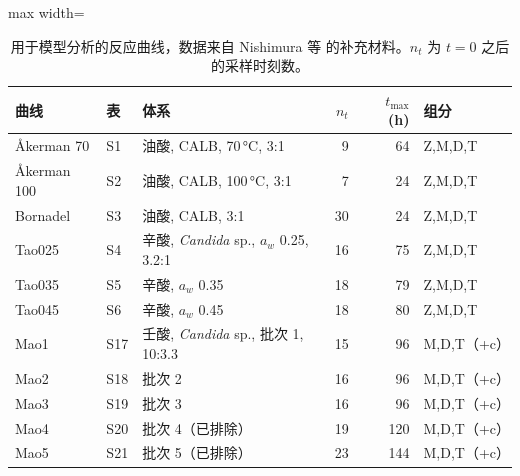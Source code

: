 \begin{table}[t]
\centering
\caption{用于模型分析的反应曲线，数据来自 Nishimura 等 \cite{nishimura2026} 的补充材料。$n_t$ 为 $t=0$ 之后的采样时刻数。}\label{tab:data}
\footnotesize
\begin{adjustbox}{max width=\linewidth}
\begin{tabular}{lllrrl}
\toprule
曲线 & 表 & 体系 & $n_t$ & $t_\mathrm{max}$ (h) & 组分 \\
\midrule
Åkerman 70 & S1 & 油酸, CALB, 70\,°C, 3:1 & 9 & 64 & Z,M,D,T \\
Åkerman 100 & S2 & 油酸, CALB, 100\,°C, 3:1 & 7 & 24 & Z,M,D,T \\
Bornadel & S3 & 油酸, CALB, 3:1 & 30 & 24 & Z,M,D,T \\
Tao025 & S4 & 辛酸, \emph{Candida} sp., $a_w$ 0.25, 3.2:1 & 16 & 75 & Z,M,D,T \\
Tao035 & S5 & 辛酸, $a_w$ 0.35 & 18 & 79 & Z,M,D,T \\
Tao045 & S6 & 辛酸, $a_w$ 0.45 & 18 & 80 & Z,M,D,T \\
Mao1 & S17 & 壬酸, \emph{Candida} sp., 批次 1, 10:3.3 & 15 & 96 & M,D,T（+c） \\
Mao2 & S18 & 批次 2 & 16 & 96 & M,D,T（+c） \\
Mao3 & S19 & 批次 3 & 16 & 96 & M,D,T（+c） \\
Mao4 & S20 & 批次 4（已排除） & 19 & 120 & M,D,T（+c） \\
Mao5 & S21 & 批次 5（已排除） & 23 & 144 & M,D,T（+c） \\
\bottomrule
\end{tabular}
\end{adjustbox}
\end{table}
